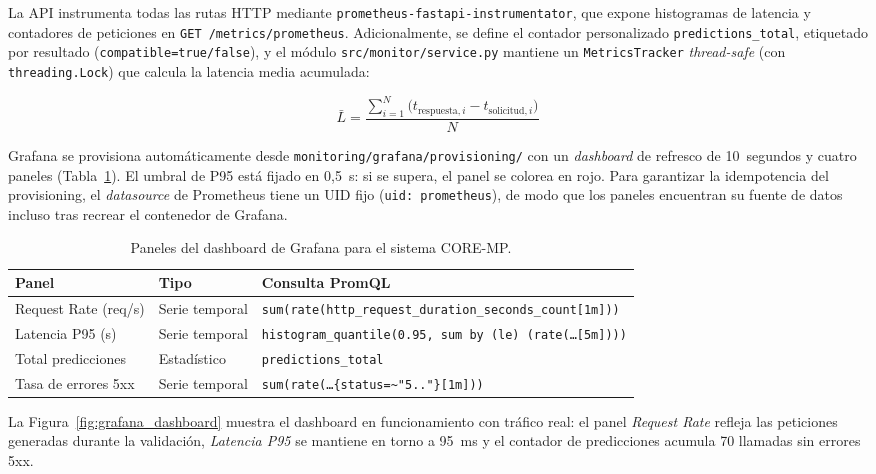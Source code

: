 La API instrumenta todas las rutas HTTP mediante \texttt{prometheus-fastapi-instrumentator}, que expone histogramas de latencia y contadores de peticiones en \texttt{GET /metrics/prometheus}. Adicionalmente, se define el contador personalizado \texttt{predictions\_total}, etiquetado por resultado (\texttt{compatible=true/false}), y el módulo \texttt{src/monitor/service.py} mantiene un \texttt{MetricsTracker} \textit{thread-safe} (con \texttt{threading.Lock}) que calcula la latencia media acumulada:

\begin{equation}
\bar{L} = \frac{\displaystyle\sum_{i=1}^{N} \bigl(t_{\text{respuesta},i} - t_{\text{solicitud},i}\bigr)}{N}
\label{eq:latencia_media}
\end{equation}

Grafana se provisiona automáticamente desde \texttt{monitoring/grafana/provisioning/} con un \textit{dashboard} de refresco de 10~segundos y cuatro paneles (Tabla~\ref{tab:grafana_paneles}). El umbral de P95 está fijado en 0{,}5~s: si se supera, el panel se colorea en rojo. Para garantizar la idempotencia del provisioning, el \textit{datasource} de Prometheus tiene un UID fijo (\texttt{uid: prometheus}), de modo que los paneles encuentran su fuente de datos incluso tras recrear el contenedor de Grafana.

\begin{table}[H]
\centering
\footnotesize
\begin{tabular}{llp{7cm}}
\hline
\textbf{Panel} & \textbf{Tipo} & \textbf{Consulta PromQL} \\ \hline
Request Rate (req/s)   & Serie temporal & \texttt{sum(rate(http\_request\_duration\_seconds\_count[1m]))} \\[4pt]
Latencia P95 (s)       & Serie temporal & \texttt{histogram\_quantile(0.95, sum by (le) (rate(\ldots[5m])))} \\[4pt]
Total predicciones     & Estadístico    & \texttt{predictions\_total} \\[4pt]
Tasa de errores 5xx    & Serie temporal & \texttt{sum(rate(\ldots\{status=\textasciitilde"5.."\}[1m]))} \\ \hline
\end{tabular}
\caption{Paneles del dashboard de Grafana para el sistema CORE-MP.}
\label{tab:grafana_paneles}
\end{table}

La Figura~\ref{fig:grafana_dashboard} muestra el dashboard en funcionamiento con tráfico real: el panel \textit{Request Rate} refleja las peticiones generadas durante la validación, \textit{Latencia P95} se mantiene en torno a 95~ms y el contador de predicciones acumula 70 llamadas sin errores 5xx.

